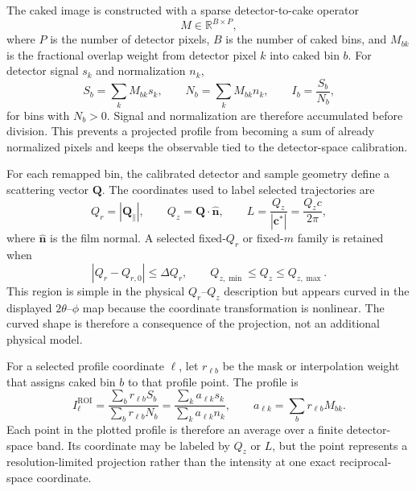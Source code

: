 The caked image is constructed with a sparse detector-to-cake operator
\begin{equation}
M\in \mathbb{R}^{B\times P},
\end{equation}
where $P$ is the number of detector pixels, $B$ is the number of caked bins, and $M_{bk}$ is the fractional overlap weight from detector pixel $k$ into caked bin $b$. For detector signal $s_k$ and normalization $n_k$,
\begin{equation}
S_b=\sum_k M_{bk}s_k,
\qquad
N_b=\sum_k M_{bk}n_k,
\qquad
I_b=\frac{S_b}{N_b},
\end{equation}
for bins with $N_b>0$. Signal and normalization are therefore accumulated before division. This prevents a projected profile from becoming a sum of already normalized pixels and keeps the observable tied to the detector-space calibration.

For each remapped bin, the calibrated detector and sample geometry define a scattering vector $\mathbf Q$. The coordinates used to label selected trajectories are
\begin{equation}
Q_r=|\mathbf Q_{\parallel}|,
\qquad
Q_z=\mathbf Q\cdot \hat{\mathbf n},
\qquad
L=\frac{Q_z}{|\mathbf c^{*}|}=\frac{Q_z c}{2\pi},
\end{equation}
where $\hat{\mathbf n}$ is the film normal. A selected fixed-$Q_r$ or fixed-$m$ family is retained when
\begin{equation}
|Q_r-Q_{r,0}|\le \Delta Q_r,
\qquad
Q_{z,\min}\le Q_z\le Q_{z,\max}.
\end{equation}
This region is simple in the physical $Q_r$--$Q_z$ description but appears curved in the displayed $2\theta$--$\phi$ map because the coordinate transformation is nonlinear. The curved shape is therefore a consequence of the projection, not an additional physical model.

For a selected profile coordinate $\ell$, let $r_{\ell b}$ be the mask or interpolation weight that assigns caked bin $b$ to that profile point. The profile is
\begin{equation}
I_{\ell}^{\mathrm{ROI}}=
\frac{\sum_b r_{\ell b}S_b}
     {\sum_b r_{\ell b}N_b}
=
\frac{\sum_k a_{\ell k}s_k}
     {\sum_k a_{\ell k}n_k},
\qquad
 a_{\ell k}=\sum_b r_{\ell b}M_{bk}.
\end{equation}
Each point in the plotted profile is therefore an average over a finite detector-space band. Its coordinate may be labeled by $Q_z$ or $L$, but the point represents a resolution-limited projection rather than the intensity at one exact reciprocal-space coordinate.

